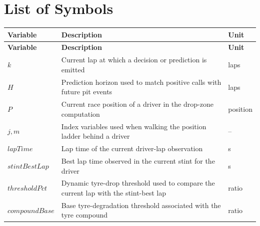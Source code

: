 \documentclass{Configuration_Files/PoliMi3i_thesis}
\begin{document}
\chapter*{List of Symbols}
\renewcommand{\arraystretch}{1.25}
\begin{longtable}{p{}p{}p{}}
    \textbf{Variable}  & \textbf{Description}                                                                                  & \textbf{Unit} \\
    \hline
    \endfirsthead

    \textbf{Variable}  & \textbf{Description}                                                                                  & \textbf{Unit} \\
    \hline
    \endhead

    $k$                & Current lap at which a decision or prediction is emitted                                              & laps          \\

    $H$                & Prediction horizon used to match positive calls with future pit events                                & laps          \\

    $P$                & Current race position of a driver in the drop-zone computation                                        & position      \\

    $j, m$             & Index variables used when walking the position ladder behind a driver                                 & --            \\

    $lapTime$          & Lap time of the current driver-lap observation                                                        & s             \\

    $stintBestLap$     & Best lap time observed in the current stint for the driver                                            & s             \\

    $thresholdPct$     & Dynamic tyre-drop threshold used to compare the current lap with the stint-best lap                   & ratio         \\

    $compoundBase$     & Base tyre-degradation threshold associated with the tyre compound                                     & ratio         \\


\end{longtable}
\end{document}
